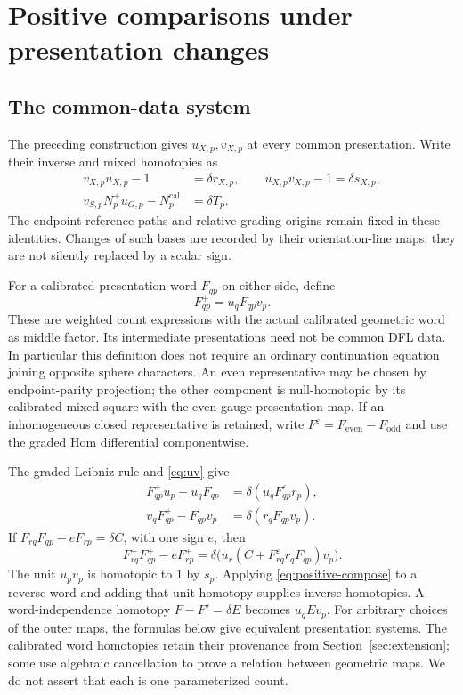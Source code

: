 \documentclass[11pt]{amsart}
\theoremstyle{definition}
\theoremstyle{remark}
\theoremstyle{plain}
\newcommand{\eps}{\varepsilon}
\newcommand{\calib}{\mathrm{cal}}
\begin{document}
\section{Positive comparisons under presentation changes}
\label{sec:positive-presentation}

\subsection{The common-data system}
The preceding construction gives $u_{X,p},v_{X,p}$ at every
common presentation. Write their inverse and mixed homotopies as
\begin{align}
 v_{X,p}u_{X,p}-1&=\delta r_{X,p},\qquad
 u_{X,p}v_{X,p}-1=\delta s_{X,p},\label{eq:uv}\\
 v_{S,p}N_p^+u_{G,p}-N_p^{\calib}&=\delta T_p.
 \label{eq:T-vertex}
\end{align}
The endpoint reference paths and relative grading origins remain
fixed in these identities. Changes of such
bases are recorded by their orientation-line maps; they are not
silently replaced by a scalar sign.

For a calibrated presentation word $F_{qp}$ on either side, define
\begin{equation}\label{eq:positive-transition}
 F^+_{qp}=u_qF_{qp}v_p.
\end{equation}
These are weighted count expressions with the actual calibrated
geometric word as middle factor. Its intermediate presentations
need not be common DFL data. In particular this definition does
not require an ordinary continuation equation joining opposite
sphere characters. An even representative may be chosen by endpoint-parity projection;
the other component is null-homotopic by its calibrated mixed
square with the even gauge presentation map. If an inhomogeneous
closed representative is retained, write
$F^\eps=F_{\mathrm{even}}-F_{\mathrm{odd}}$ and use the
graded Hom differential componentwise.

The graded Leibniz rule and \eqref{eq:uv} give
\begin{align*}
 F^+_{qp}u_p-u_qF_{qp}&=\delta(u_qF_{qp}^\eps r_p),\\
 v_qF^+_{qp}-F_{qp}v_p&=\delta(r_qF_{qp}v_p).
\end{align*}
If $F_{rq}F_{qp}-eF_{rp}=\delta C$, with one sign $e$, then
\begin{equation}\label{eq:positive-compose}
 F^+_{rq}F^+_{qp}-eF^+_{rp}
 =\delta\bigl(u_r(C+F_{rq}^\eps r_qF_{qp})v_p\bigr).
\end{equation}
The unit $u_pv_p$ is homotopic to $1$ by $s_p$. Applying
\eqref{eq:positive-compose} to a reverse word and adding that
unit homotopy supplies inverse homotopies. A word-independence
homotopy $F-F'=\delta E$ becomes $u_qEv_p$. For arbitrary choices of the outer maps, the formulas below
give equivalent presentation systems. The calibrated word homotopies
retain their provenance from Section~\ref{sec:extension}; some
use algebraic cancellation to prove a relation between geometric
maps. We do not assert that each is one parameterized count.
\end{document}
